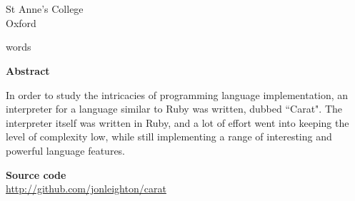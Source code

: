 \begin{titlepage}
\begin{center}

  {\GaramondClassicoSC {\huge \textbf{\gettitle}}} \\
  \bigskip
  {\Large
    \textbf{\getauthor} \\
    St Anne's College \\
    Oxford}\\
  \bigskip
  {\large \getdate}
  
	 words
	
	\vspace{1.5cm}
	
	{\Large \textbf{Abstract}}\\
  \parbox{10cm}{
  \bigskip
  In order to study the intricacies of programming language implementation, an interpreter for a 
  language similar to Ruby was written, dubbed ``Carat". The interpreter itself was written in
  Ruby, and a lot of effort went into keeping the level of complexity low, while still implementing
  a range of interesting and powerful language features.
  }
	
	\vspace{1cm}
	
	\textbf{Source code} \\
	\url{http://github.com/jonleighton/carat}

\end{center}
\end{titlepage}

